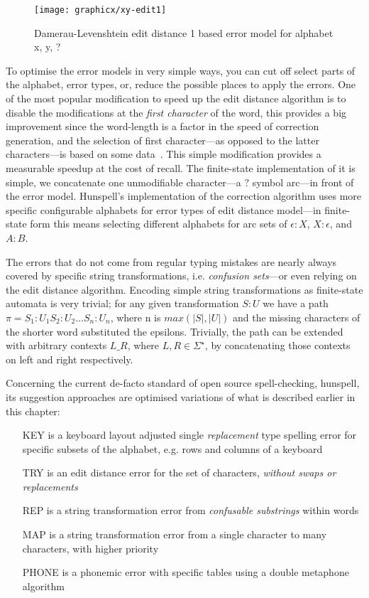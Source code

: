 \documentclass[a4paper,12pt]{article}
\begin{document}
\begin{figure}
    \centering
    \texttt{[image: graphicx/xy-edit1]}
    \caption{Damerau-Levenshtein edit distance 1 based error model for
        alphabet {x, y, ?}
    \label{fig:xy-edit-1}}
\end{figure}

To optimise the error models in very simple ways, you can cut off select parts
of the alphabet, error types, or, reduce the possible places to apply the
errors.  One of the most popular modification to speed up the edit distance
algorithm is to disable the modifications at the \emph{first character} of the
word, this provides a big improvement since the word-length is a factor in the
speed of correction generation, and the selection of first character---as
opposed to the latter characters---is based on some
data~\cite[]{bhagat2007spelling}.  This simple modification provides a
measurable speedup at the cost of recall. The finite-state implementation of it
is simple, we concatenate one unmodifiable character---a $?$ symbol arc---in
front of the error model.  Hunspell's implementation of the correction
algorithm uses more specific configurable alphabets for error types of edit
distance model---in finite-state form this means selecting different alphabets
for arc sets of $\epsilon:X$, $X:\epsilon$, and $A:B$.

The errors that do not come from regular typing mistakes are
nearly always covered by specific string transformations, i.e.
\emph{confusion sets}---or even relying on the edit distance algorithm.
Encoding simple string transformations as finite-state automata is very
trivial; for any given transformation $S:U$ we have a path $\pi = S_1:U_1
S_2:U_2 \ldots S_n:U_n$, where n is $max(|S|, |U|)$ and the missing characters
of the shorter word substituted the epsilons.  Trivially, the path can be
extended with arbitrary contexts $L \_ R$, where $L, R \in \Sigma^{\star}$, by
concatenating those contexts on left and right respectively. 

Concerning the current de-facto standard of open source spell-checking,
hunspell, its suggestion approaches are optimised variations of what is
described earlier in this chapter:

\begin{itemize}
    \item[KEY] is a keyboard layout adjusted single \emph{replacement} type
        spelling error for specific subsets of the alphabet, e.g. rows and 
        columns of a keyboard
    \item[TRY] is an edit distance error for the set of characters, 
        \emph{without swaps or replacements}
    \item[REP] is a string transformation error from \emph{confusable
        substrings} within words
    \item[MAP] is a string transformation error from a single character to 
        many characters, with higher priority
    \item[PHONE] is a phonemic error with specific tables using a double
        metaphone algorithm
\end{itemize}
\end{document}
